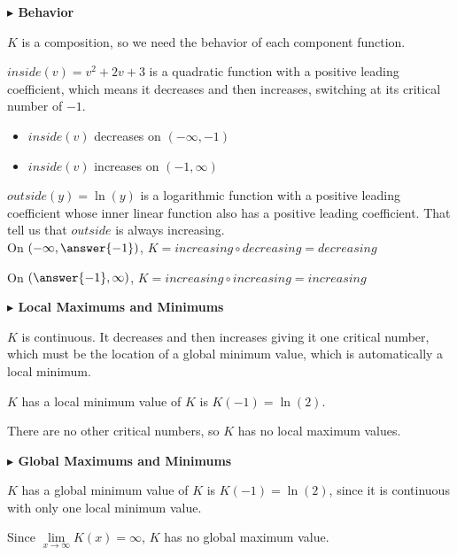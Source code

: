 \documentclass{ximera}
\begin{document}
\textbf{\textcolor{blue!55!black}{$\blacktriangleright$ Behavior}} 


$K$ is a composition, so we need the behavior of each component function. 




$inside(v) = v^2 + 2v + 3$ is a quadratic function with a positive leading coefficient, which means it decreases and then increases, switching at its critical number of $-1$. 

\begin{itemize}
\item $inside(v)$ decreases on $(-\infty, -1)$ \\
\item $inside(v)$ increases on $(-1, \infty)$ 
\end{itemize}




$outside(y) = \ln(y)$ is a logarithmic function with a positive leading coefficient whose inner linear function also has a positive leading coefficient. That tell us that $outside$ is always increasing. \\


On $\left( -\infty, \answer{-1} \right)$, $K = increasing \circ decreasing = decreasing$


On $\left( \answer{-1}, \infty \right)$, $K = increasing \circ increasing = increasing$









\textbf{\textcolor{blue!55!black}{$\blacktriangleright$ Local Maximums and Minimums}} 


$K$ is continuous.  It decreases and then increases giving it one critical number, which must be the location of a global minimum value, which is automatically a local minimum. 

$K$ has a local minimum value of $K$ is $K(-1) = \ln(2)$. 


There are no other critical numbers, so $K$ has no local maximum values. 






\textbf{\textcolor{blue!55!black}{$\blacktriangleright$ Global Maximums and Minimums}} 


$K$ has a global minimum value of $K$ is $K(-1) = \ln(2)$, since it is continuous with only one local minimum value. 




Since $\lim\limits_{x \to \infty}K(x) = \infty$, $K$ has no global maximum value.
\end{document}
